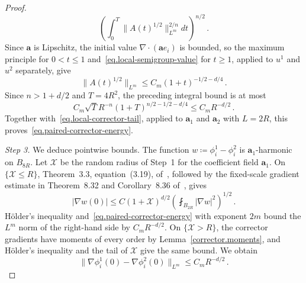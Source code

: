 \documentclass[11pt]{amsart}
\theoremstyle{definition}
\theoremstyle{remark}
\numberwithin{equation}{section}
\renewcommand{\a}{\mathbf a}
\begin{document}
\begin{proof}
\begin{equation*}
 \left(\int_0^T\|A(t)^{1/2}\|_{L^m}^{2/n}dt\right)^{n/2}\, .
\end{equation*}
Since $\a$ is Lipschitz, the initial value $\nabla\cdot(\a e_i)$ is bounded, so the maximum principle for $0<t\leq1$ and~\eqref{eq.local-semigroup-value} for $t\geq1$, applied to $u^1$ and $u^2$ separately, give
\begin{equation*}
 \|A(t)^{1/2}\|_{L^m}\leq C_m(1+t)^{-1/2-d/4}\, .
\end{equation*}
Since $n>1+d/2$ and $T=4R^2$, the preceding integral bound is at most
\begin{equation*}
 C_m\sqrt T R^{-n}(1+T)^{n/2-1/2-d/4}
 \leq C_mR^{-d/2}\, .
\end{equation*}
Together with~\eqref{eq.local-corrector-tail}, applied to $\a_1$ and $\a_2$ with $L=2R$, this proves~\eqref{eq.paired-corrector-energy}.

\emph{Step 3.} We deduce pointwise bounds. The function $w\coloneqq\phi_i^1-\phi_i^2$ is $\a_1$-harmonic on $B_{8R}$. Let $\mathcal X$ be the random radius of Step~1 for the coefficient field $\a_1$. On $\{\mathcal X\leq R\}$, Theorem~3.3, equation~(3.19), of~\citet{AKM2019book}, followed by the fixed-scale gradient estimate in Theorem~8.32 and Corollary~8.36 of~\citet{GilbargTrudinger2001}, gives
\begin{equation*}
 |\nabla w(0)|
 \leq C(1+\mathcal X)^{d/2}
 \left(\fint_{B_{2R}}|\nabla w|^2\right)^{1/2}\, .
\end{equation*}
H\"older's inequality and~\eqref{eq.paired-corrector-energy} with exponent $2m$ bound the $L^m$ norm of the right-hand side by $C_mR^{-d/2}$. On $\{\mathcal X>R\}$, the corrector gradients have moments of every order by Lemma~\ref{corrector.moments}, and H\"older's inequality and the tail of $\mathcal X$ give the same bound. We obtain
\begin{equation}\label{eq.paired-point-gradient}
 \|\nabla\phi_i^1(0)-\nabla\phi_i^2(0)\|_{L^m}\leq C_mR^{-d/2}\, .
\end{equation}


\end{proof}
\end{document}
